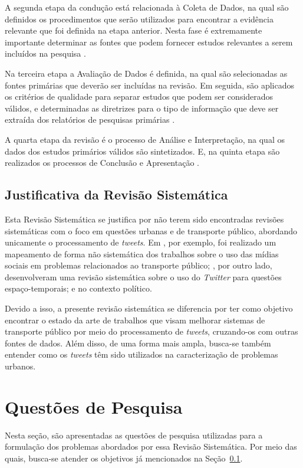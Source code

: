 \documentclass[
	12pt,				%
	oneside,			%
	a4paper,			%
	english,			%
	brazil				%
	]{abntex2ppgsi}
\begin{document}
{{A segunda etapa da condução está relacionada à Coleta de Dados, na qual são definidos os procedimentos que serão utilizados para encontrar a evidência relevante que foi definida na etapa anterior. Nesta fase é extremamente importante determinar as fontes que podem fornecer estudos relevantes a serem incluídos na pesquisa \cite{biolchini2005techincal}.

Na terceira etapa a Avaliação de Dados é definida, na qual são selecionadas as fontes primárias que deverão ser incluídas na revisão. Em seguida,  são aplicados os critérios de qualidade para separar estudos que podem ser considerados válidos, e determinadas as diretrizes para o tipo de informação que deve ser extraída dos relatórios de pesquisas primárias \cite{biolchini2005techincal}.

A quarta etapa da revisão é o processo de Análise e Interpretação, na qual os dados dos estudos primários válidos são sintetizados. E, na quinta etapa são realizados os processos de Conclusão e Apresentação \cite{biolchini2005techincal}.

\subsection{Justificativa da Revisão Sistemática}
\label{justificativa}
Esta Revisão Sistemática se justifica por não terem sido encontradas revisões sistemáticas com o foco em questões urbanas e de transporte público, abordando unicamente o processamento de \textit{tweets}. Em \cite{Chaniotakis2016}, por exemplo, foi realizado um mapeamento de forma não sistemática dos trabalhos sobre o uso das mídias sociais em problemas relacionados ao transporte público; \cite{steiger2015advanced}, por outro lado, desenvolveram uma revisão sistemática sobre o uso do \textit{Twitter} para questões espaço-temporais; e \cite{jungherr2016twitter} no contexto político.%

Devido a isso, a presente revisão sistemática se diferencia por ter como objetivo encontrar o estado da arte de trabalhos que visam melhorar sistemas de transporte público por meio do processamento de \textit{tweets}, cruzando-os com outras fontes de dados. Além disso, de uma forma mais ampla, busca-se também entender como os \textit{tweets} têm sido utilizados na caracterização  de problemas urbanos.

\section{Questões de Pesquisa}
\label{questoes}
Nesta seção, são apresentadas as questões de pesquisa utilizadas para a formulação dos problemas abordados por essa Revisão Sistemática. Por meio das quais, busca-se atender os objetivos já mencionados na Seção~\ref{justificativa}.

}}
\end{document}
